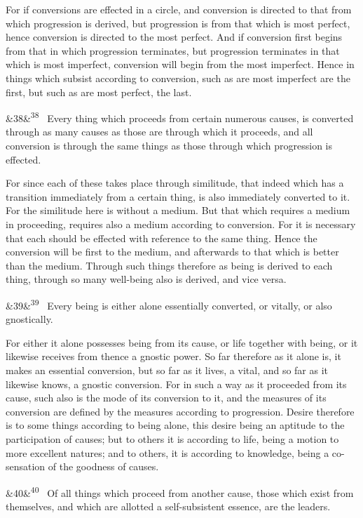 \documentclass[12pt]{article}
\newcommand{\para}[1][]{\par\noindent\ifx&#1&\else\textsuperscript{\footnotesize #1}~\fi}
\begin{document}
For if conversions are effected in a circle, and conversion is directed to that from which progression is derived, but progression is from that which is most perfect, hence conversion is directed to the most perfect. And if conversion first begins from that in which progression terminates, but progression terminates in that which is most imperfect, conversion will begin from the most imperfect. Hence in things which subsist according to conversion, such as are most imperfect are the first, but such as are most perfect, the last.

\para[38] Every thing which proceeds from certain numerous causes, is converted through as many causes as those are through which it proceeds, and all conversion is through the same things as those through which progression is effected.

For since each of these takes place through similitude, that indeed which has a transition immediately from a certain thing, is also immediately converted to it. For the similitude here is without a medium. But that which requires a medium in proceeding, requires also a medium according to conversion. For it is necessary that each should be effected with reference to the same thing. Hence the conversion will be first to the medium, and afterwards to that which is better than the medium. Through such things therefore as being is derived to each thing, through so many well-being also is derived, and vice versa.

\para[39] Every being is either alone essentially converted, or vitally, or also gnostically.

For either it alone possesses being from its cause, or life together with being, or it likewise receives from thence a gnostic power. So far therefore as it alone is, it makes an essential conversion, but so far as it lives, a vital, and so far as it likewise knows, a gnostic conversion. For in such a way as it proceeded from its cause, such also is the mode of its conversion to it, and the measures of its conversion are defined by the measures according to progression. Desire therefore is to some things according to being alone, this desire being an aptitude to the participation of causes; but to others it is according to life, being a motion to more excellent natures; and to others, it is according to knowledge, being a co-sensation of the goodness of causes.

\para[40] Of all things which proceed from another cause, those which exist from themselves, and which are allotted a self-subsistent essence, are the leaders.
\end{document}
